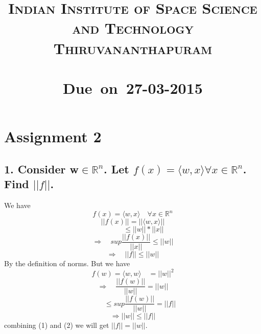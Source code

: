 \documentclass{article}
\title{
\textsc{Indian Institute of Space Science and Technology Thiruvananthapuram} \\ [25pt]
\vspace{2in}
\textmd{\textbf{\hmwkTitle}}\\
\normalsize\vspace{0.1in}\small{Due\ on\ 27-03-2015}\\
\vspace{3in}
}
\author{\textbf{\hmwkAuthorName}}
\date{} %
\begin{document}
\maketitle



\newpage
\newpage


\section{Assignment 2}

\subsection{\textbf{1. Consider w$\in \mathbb{R}^n$. Let $f(x)=\langle w,x\rangle \forall x \in \mathbb{R}^n$. Find $||f||$.}}
We have 
\[f(x)=\langle w,x\rangle \quad \forall x \in \mathbb{R}^n \]
\[||f(x)||=||\langle w,x\rangle|| \]
\[\quad \quad \quad \leq ||w||*||x|| \]
\[ \Longrightarrow \quad sup \frac{||f(x)||}{||x||} \leq ||w|| \]
\begin{equation}
\Longrightarrow \quad ||f|| \leq ||w|| 
\end{equation}
By the definition of norms. But we have\\
\[f(w) = \langle w,w\rangle \quad = ||w||^2 \]
\[\Longrightarrow \quad \frac{||f(w)||}{||w||} = ||w|| \]
\[\quad \quad \leq sup \frac{||f(w)||}{||w||}  = ||f|| \]
\begin{equation}
\Longrightarrow ||w|| \leq ||f|| 
\end{equation}
combining (1) and (2) we will get $||f||=||w||$.
\end{document}
